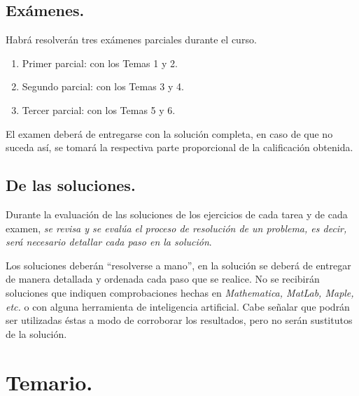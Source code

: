 \documentclass[12pt]{article}
\numberwithin{equation}{section}
\begin{document}
\subsection{Exámenes.}

Habrá resolverán tres exámenes parciales durante el curso.
\begin{enumerate}[leftmargin=1.5\parindent]
\item Primer parcial: con los Temas 1 y 2.
\item Segundo parcial: con los Temas 3 y 4.
\item Tercer parcial: con los Temas 5 y 6.
\end{enumerate}

El examen deberá de entregarse con la solución completa, en caso de que no suceda así, se tomará la respectiva parte proporcional de la calificación obtenida.

\subsection{De las soluciones.}

Durante la evaluación de las soluciones de los ejercicios de cada tarea y de cada examen, \emph{se revisa y se evalúa el proceso de resolución de un problema, es decir, será necesario detallar cada paso en la solución}.

Los soluciones deberán \enquote{resolverse a mano}, en la solución se deberá de entregar de manera detallada y ordenada cada paso que se realice. No se recibirán soluciones que indiquen comprobaciones hechas en \emph{Mathematica, MatLab, Maple, etc.} o con alguna herramienta de inteligencia artificial. Cabe señalar que podrán ser utilizadas éstas a modo de corroborar los resultados, pero no serán sustitutos de la solución.

\section{Temario.}
\end{document}
